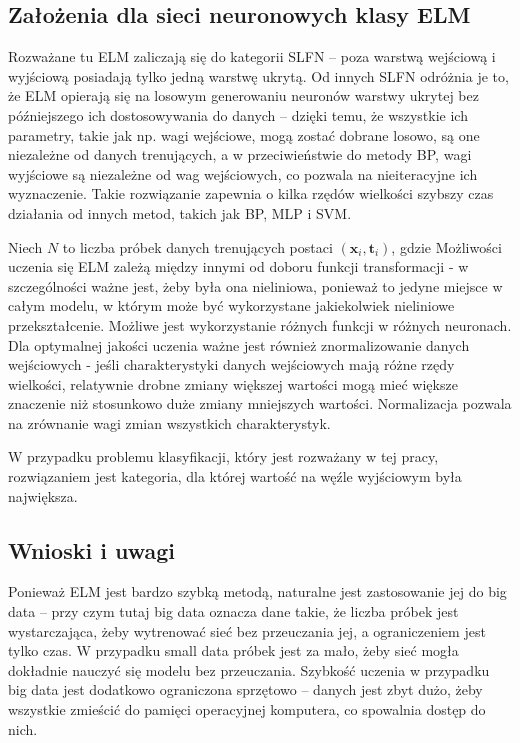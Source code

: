 \documentclass{article}
\begin{document}
\subsection{Założenia dla sieci neuronowych klasy ELM}
Rozważane tu ELM zaliczają się do kategorii SLFN -- poza warstwą wejściową i wyjściową posiadają tylko jedną warstwę ukrytą. Od innych SLFN odróżnia je to, że ELM opierają się na losowym generowaniu neuronów warstwy ukrytej bez późniejszego ich dostosowywania do danych -- dzięki temu, że wszystkie ich parametry, takie jak np. wagi wejściowe, mogą zostać dobrane losowo, są one niezależne od danych trenujących, a w przeciwieństwie do metody BP, wagi wyjściowe są niezależne od wag wejściowych, co pozwala na nieiteracyjne ich wyznaczenie. Takie rozwiązanie zapewnia o kilka rzędów wielkości szybszy czas działania od innych metod, takich jak BP, MLP i SVM. \par 
Niech $N$ to liczba próbek danych trenujących postaci $(\textbf{x}_i, \textbf{t}_i)$, gdzie  
Możliwości uczenia się ELM zależą między innymi od doboru funkcji transformacji - w szczególności ważne jest, żeby była ona nieliniowa, ponieważ to jedyne miejsce w całym modelu, w którym może być wykorzystane jakiekolwiek nieliniowe przekształcenie. Możliwe jest wykorzystanie różnych funkcji w różnych neuronach. Dla optymalnej jakości uczenia ważne jest również znormalizowanie danych wejściowych - jeśli charakterystyki danych wejściowych mają różne rzędy wielkości, relatywnie drobne zmiany większej wartości mogą mieć większe znaczenie niż stosunkowo duże zmiany mniejszych wartości. Normalizacja pozwala na zrównanie wagi zmian wszystkich charakterystyk. \par
W przypadku problemu klasyfikacji, który jest rozważany w tej pracy, rozwiązaniem jest kategoria, dla której wartość na węźle wyjściowym była największa. 
\subsection{Wnioski i uwagi}
Ponieważ ELM jest bardzo szybką metodą, naturalne jest zastosowanie jej do big data -- przy czym tutaj big data oznacza dane takie, że liczba próbek jest wystarczająca, żeby wytrenować sieć bez przeuczania jej, a ograniczeniem jest tylko czas. W przypadku small data próbek jest za mało, żeby sieć mogła dokładnie nauczyć się modelu bez przeuczania. Szybkość uczenia w przypadku big data jest dodatkowo ograniczona sprzętowo -- danych jest zbyt dużo, żeby wszystkie zmieścić do pamięci operacyjnej komputera, co spowalnia dostęp do nich.
\end{document}
